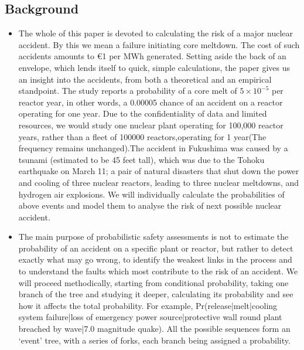 \documentclass{article}
\begin{document}
\subsection{Background}
\begin{itemize}
    \item The whole of this paper is devoted to calculating the risk of a major nuclear accident.  By this we mean a failure initiating core meltdown. The cost of such accidents amounts to €1 per MWh generated. Setting aside the back of an envelope, which lends itself to quick, simple calculations, the paper gives us an insight into the accidents, from both a theoretical and an empirical standpoint. The study reports a probability of a core melt of $5\times10^{-5}$ per reactor year, in other words, a 0.00005 chance of an accident on a reactor operating for one year. Due to the confidentiality of data and limited resources, we would study one nuclear plant operating for 100,000 reactor years, rather than a fleet of 100000 reactors,operating for 1 year(The frequency remains unchanged)\cite{cite1}.The accident in Fukushima was caused by a tsunami (estimated to be 45 feet tall), which was due to the Tohoku earthquake on March 11; a pair of natural disasters that shut down the power and cooling of three nuclear reactors, leading to three nuclear meltdowns, and hydrogen air explosions. We will individually calculate the probabilities of above events and model them to analyse the risk of next possible nuclear accident.


    \item
    The main purpose of probabilistic safety assessments is not to estimate the probability of an accident on a specific plant or reactor, but rather to detect exactly what may go wrong, to identify the weakest links in the process and to understand the faults which most contribute to the risk of an accident. We will proceed methodically, starting from conditional probability, taking one branch of the tree and studying it deeper, calculating its probability and see how it affects the total probability. For example, Pr(release|melt|cooling system failure|loss of emergency power source|protective wall round plant breached by wave|7.0 magnitude quake)\cite{cite1}. All the possible sequences form an ‘event’ tree, with a series of forks, each branch being assigned a probability.


\end{itemize}
\end{document}
